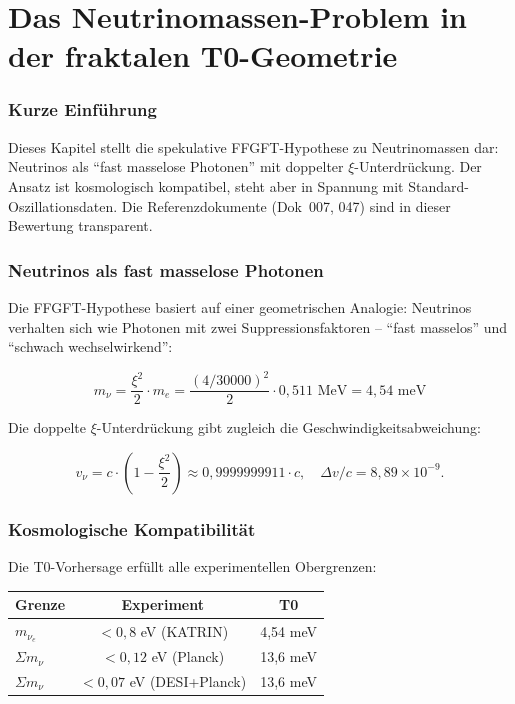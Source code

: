 \chapter{Das Neutrinomassen-Problem in der fraktalen T0-Geometrie}


	
	\subsection*{Kurze Einführung}
	
	Dieses Kapitel stellt die spekulative FFGFT-Hypothese zu Neutrinomassen dar: Neutrinos als ``fast masselose Photonen'' mit doppelter \(\xi\)-Unterdrückung. Der Ansatz ist kosmologisch kompatibel, steht aber in Spannung mit Standard-Oszillationsdaten. Die Referenzdokumente (Dok~007, 047) sind in dieser Bewertung transparent.
	
	\subsection*{Neutrinos als fast masselose Photonen}
	
	Die FFGFT-Hypothese basiert auf einer geometrischen Analogie: Neutrinos verhalten sich wie Photonen mit zwei Suppressionsfaktoren – ``fast masselos'' und ``schwach wechselwirkend'':
	
	\begin{equation}
		\boxed{m_\nu = \frac{\xi^2}{2} \cdot m_e = \frac{(4/30000)^2}{2} \cdot 0{,}511\text{ MeV} = 4{,}54\text{ meV}}
	\end{equation}
	
	Die doppelte \(\xi\)-Unterdrückung gibt zugleich die Geschwindigkeitsabweichung:
	
	\begin{equation}
		v_\nu = c \cdot \left(1 - \frac{\xi^2}{2}\right) \approx 0{,}9999999911 \cdot c, \quad \Delta v/c = 8{,}89 \times 10^{-9}.
	\end{equation}
	
	
	\subsection*{Kosmologische Kompatibilität}
	
	Die T0-Vorhersage erfüllt alle experimentellen Obergrenzen:
	
	\begin{center}
		\small
		\begin{tabular}{lcc}
			\textbf{Grenze} & \textbf{Experiment} & \textbf{T0} \\
			\hline
			\(m_{\nu_e}\) & \(< 0{,}8\) eV (KATRIN) & 4,54 meV \\
			\(\Sigma m_\nu\) & \(< 0{,}12\) eV (Planck) & 13,6 meV \\
			\(\Sigma m_\nu\) & \(< 0{,}07\) eV (DESI+Planck) & 13,6 meV \\
		\end{tabular}
	\end{center}
	
